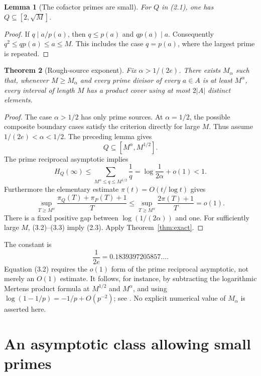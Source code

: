 \documentclass[11pt,a4paper]{article}
\newtheorem{theorem}{Theorem}[section]
\newtheorem{lemma}[theorem]{Lemma}
\theoremstyle{remark}
\begin{document}
\begin{lemma}[The cofactor primes are small]
For \(Q\) in (2.1), one has \(Q\subseteq[2,\sqrt M]\).
\end{lemma}
\begin{proof}
If \(q\mid a/p(a)\), then \(q\le p(a)\) and \(qp(a)\mid a\).
Consequently \(q^2\le qp(a)\le a\le M\).
This includes the case \(q=p(a)\), where the largest prime is repeated.
\end{proof}

\begin{theorem}[Rough-source exponent]
\label{thm:rough}
Fix \(\alpha>1/(2e)\). There exists \(M_\alpha\) such that, whenever
\(M\ge M_\alpha\) and every prime divisor of every \(a\in A\) is at
least \(M^\alpha\), every interval of length \(M\) has a product cover
using at most \(2|A|\) distinct elements.
\end{theorem}
\begin{proof}
The case \(\alpha>1/2\) has only prime sources. At \(\alpha=1/2\),
the possible composite boundary cases satisfy the criterion directly
for large \(M\). Thus assume \(1/(2e)<\alpha<1/2\).
The preceding lemma gives
\[
 Q\subseteq[M^\alpha,M^{1/2}].
 \tag{3.1}
\]
The prime reciprocal asymptotic implies
\[
 H_Q(\infty)\le
 \sum_{M^\alpha\le q\le M^{1/2}}\frac1q
 =\log\frac1{2\alpha}+o(1)<1.
 \tag{3.2}
\]
Furthermore the elementary estimate \(\pi(t)=O(t/\log t)\) gives
\[
 \sup_{T\ge M^\alpha}\frac{\pi_Q(T)+\pi_P(T)+1}{T}
 \le\sup_{T\ge M^\alpha}\frac{2\pi(T)+1}{T}=o(1).
 \tag{3.3}
\]
There is a fixed positive gap between \(\log(1/(2\alpha))\) and one.
For sufficiently large \(M\), (3.2)--(3.3) imply (2.3).
Apply Theorem~\ref{thm:exact}.
\end{proof}

The constant is
\[
 \frac1{2e}=0.1839397205857\ldots.
 \tag{3.4}
\]
Equation (3.2) requires the \(o(1)\) form of the prime reciprocal
asymptotic, not merely an \(O(1)\) estimate. It follows, for instance,
by subtracting the logarithmic Mertens product formula at
\(M^{1/2}\) and \(M^\alpha\), and using
\(\log(1-1/p)=-1/p+O(p^{-2})\); see \cite{TaoMertens}.
No explicit numerical value of \(M_\alpha\) is asserted here.

\section{An asymptotic class allowing small primes}
\label{sec:asymclass}
\end{document}
